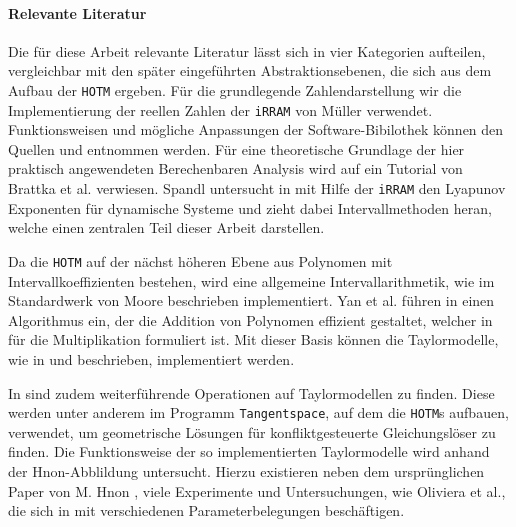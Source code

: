 \paragraph{Relevante Literatur}
Die für diese Arbeit relevante Literatur lässt sich in vier Kategorien aufteilen, vergleichbar mit den später eingeführten Abstraktionsebenen, die sich aus dem Aufbau der \verb+HOTM+ ergeben. Für die grundlegende Zahlendarstellung wir die Implementierung der reellen Zahlen der \verb+iRRAM+ von Müller verwendet. Funktionsweisen und mögliche Anpassungen der Software-Bibilothek können den Quellen \cite{Mller2009EnhancingIE} und  \cite{mueller2001} entnommen werden. Für eine theoretische Grundlage der hier praktisch angewendeten Berechenbaren Analysis wird auf ein Tutorial von Brattka et al. \cite{Brattka2008} verwiesen. Spandl untersucht in \cite{DBLP:spandl} mit Hilfe der \verb+iRRAM+ den Lyapunov Exponenten für dynamische Systeme und zieht dabei Intervallmethoden heran, welche einen zentralen Teil dieser Arbeit darstellen. 

Da die \verb+HOTM+ auf der nächst höheren Ebene aus Polynomen mit Intervallkoeffizienten bestehen, wird eine allgemeine Intervallarithmetik, wie im Standardwerk von Moore \cite{moore1979} beschrieben implementiert. Yan et al. führen in \cite{geobuckets} einen Algorithmus ein, der die Addition von Polynomen effizient gestaltet, welcher in \cite{geobucketsmulti} für die Multiplikation formuliert ist. Mit dieser Basis können die Taylormodelle, wie in \cite{makino2001} und \cite{DBLP:conf/macis/BrausseKM15} beschrieben, implementiert werden.

In \cite{DBLP:conf/macis/BrausseKM15} sind zudem weiterführende Operationen auf Taylormodellen zu finden. Diese werden unter anderem im Programm \verb+Tangentspace+, auf dem die \verb+HOTM+s aufbauen, verwendet, um geometrische Lösungen für konfliktgesteuerte Gleichungslöser zu finden. Die Funktionsweise der so implementierten Taylormodelle wird anhand der H\e non-Abblildung untersucht. Hierzu existieren neben dem ursprünglichen Paper von M. H\e non \cite{henon1976}, viele Experimente und Untersuchungen, wie Oliviera et al., die sich in \cite{MartinsdeOliveira2020} mit verschiedenen Parameterbelegungen beschäftigen.






